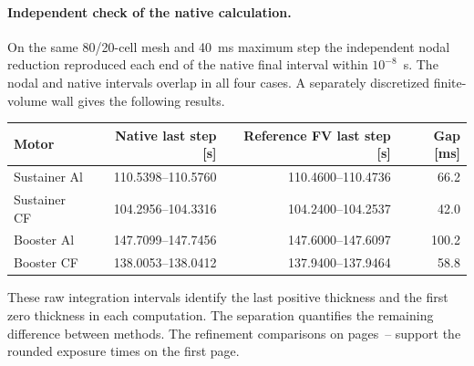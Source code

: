 \paragraph{Independent check of the native calculation.}
On the same 80/20-cell mesh and 40~ms maximum step the independent nodal
reduction reproduced each end of the native final interval within $10^{-8}$~s.
The nodal and native intervals overlap in all four cases. A separately
discretized finite-volume wall gives the following results.
\begin{center}\small\begin{tabular}{lrrr}\toprule
Motor & Native last step [s] & Reference FV last step [s] & Gap [ms]\\\midrule
Sustainer Al & 110.5398--110.5760 & 110.4600--110.4736 & 66.2 \\
Sustainer CF & 104.2956--104.3316 & 104.2400--104.2537 & 42.0 \\
Booster Al & 147.7099--147.7456 & 147.6000--147.6097 & 100.2 \\
Booster CF & 138.0053--138.0412 & 137.9400--137.9464 & 58.8 \\
\bottomrule\end{tabular}\end{center}
These raw integration intervals identify the last positive thickness and
the first zero thickness in each computation. The separation quantifies the
remaining difference between methods. The refinement comparisons on
pages~\pageref{sec:intervals}--\pageref{sec:matched} support the rounded
exposure times on the first page.
\clearpage
